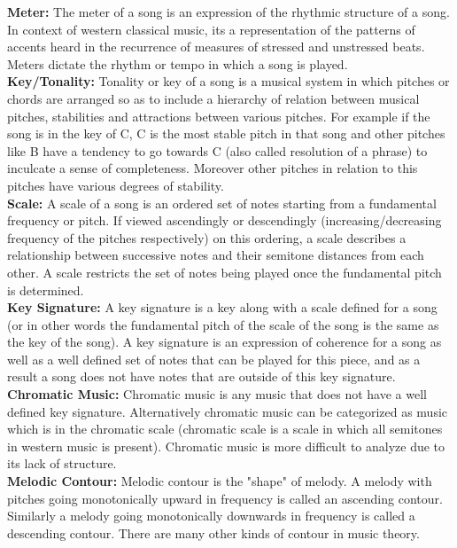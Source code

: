 \noindent \textbf{Meter:} The meter of a song is an expression of the rhythmic structure of a song. In context of western classical music, its a representation of the patterns of accents heard in the recurrence of measures of stressed and unstressed beats. Meters dictate the rhythm or tempo in which a song is played. \\

\noindent \textbf{Key/Tonality:} Tonality or key of a song is a musical system in which pitches or chords are arranged so as to include a hierarchy of relation between musical pitches, stabilities and attractions between various pitches. For example if the song is in the key of C, C is the most stable pitch in that song and other pitches like B have a tendency to go towards C (also called resolution of a phrase) to inculcate a sense of completeness. Moreover other pitches in relation to this pitches have various degrees of stability. \\

\noindent \textbf{Scale:} A scale of a song is an ordered set of notes starting from a fundamental frequency or pitch. If viewed ascendingly or descendingly (increasing/decreasing frequency of the pitches respectively) on this ordering, a scale describes a relationship between successive notes and their semitone distances from each other. A scale restricts the set of notes being played once the fundamental pitch is determined. \\

\noindent \textbf{Key Signature:} A key signature is a key along with a scale defined for a song (or in other words the fundamental pitch of the scale of the song is the same as the key of the song). A key signature is an expression of coherence for a song as well as a well defined set of notes that can be played for this piece, and as a result a song does not have notes that are outside of this key signature. \\

\noindent \textbf{Chromatic Music:} Chromatic music is any music that does not have a well defined key signature. Alternatively chromatic music can be categorized as music which is in the chromatic scale (chromatic scale is a scale in which all semitones in western music is present). Chromatic music is more difficult to analyze due to its lack of structure. \\

\noindent \textbf{Melodic Contour:} Melodic contour is the "shape" of melody. A melody with pitches going monotonically upward in frequency is called an ascending contour. Similarly a melody going monotonically downwards in frequency is called a descending contour. There are many other kinds of contour in music theory. \\

